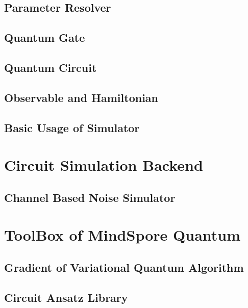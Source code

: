 \documentclass[pra,twocolumn,superscriptaddress,floatfix,nofootinbib,amsmath,amssymb]{revtex4-1}
\numberwithin{equation}{section}
\numberwithin{figure}{section}
\numberwithin{table}{section}
\begin{document}
\subsection{Parameter Resolver}


\subsection{Quantum Gate}


\subsection{Quantum Circuit}


\subsection{Observable and Hamiltonian}


\subsection{Basic Usage of Simulator}
\label{sec:sim_basic_usage}



\section{Circuit Simulation Backend}
\label{sec:backend}



\subsection{Channel Based Noise Simulator}


\section{ToolBox of MindSpore Quantum}
\label{sec:toolbox}
\subsection{Gradient of Variational Quantum Algorithm}


\subsection{Circuit Ansatz Library}

\end{document}

